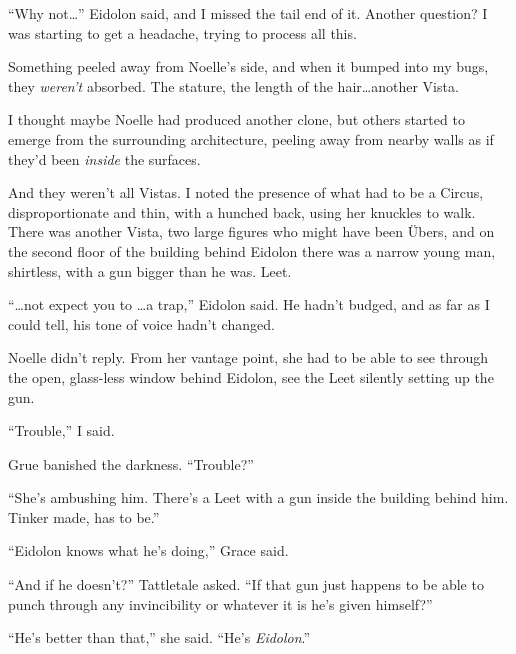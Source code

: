 ``Why not\ldots'' Eidolon said, and I missed the tail end of it.  Another question?  I was starting to get a headache, trying to process all this.



Something peeled away from Noelle's side, and when it bumped into my bugs, they \emph{weren't} absorbed.  The stature, the length of the hair\ldots another Vista.



I thought maybe Noelle had produced another clone, but others started to emerge from the surrounding architecture, peeling away from nearby walls as if they'd been \emph{inside} the surfaces.



And they weren't all Vistas.  I noted the presence of what had to be a Circus, disproportionate and thin, with a hunched back, using her knuckles to walk.  There was another Vista, two large figures who might have been \"{U}bers, and on the second floor of the building behind Eidolon there was a narrow young man, shirtless, with a gun bigger than he was.  Leet.



``\ldots{}not expect you to \ldots a trap,'' Eidolon said.  He hadn't budged, and as far as I could tell, his tone of voice hadn't changed.



Noelle didn't reply.  From her vantage point, she had to be able to see through the open, glass-less window behind Eidolon, see the Leet silently setting up the gun.



``Trouble,'' I said.



Grue banished the darkness.  ``Trouble?''



``She's ambushing him.  There's a Leet with a gun inside the building behind him.  Tinker made, has to be.''



``Eidolon knows what he's doing,'' Grace said.



``And if he doesn't?'' Tattletale asked.  ``If that gun just happens to be able to punch through any invincibility or whatever it is he's given himself?''



``He's better than that,'' she said.  ``He's \emph{Eidolon}.''




